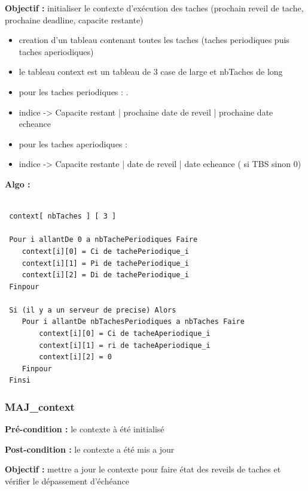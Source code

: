 				\textbf{Objectif : }initialiser le contexte d'exécution des taches (prochain reveil de tache, prochaine deadline, capacite restante)
				 \begin{itemize}
				 	\item creation d'un tableau contenant toutes les taches (taches periodiques puis taches aperiodiques)
 				 	\item le tableau context est un tableau de 3 case de large et nbTaches de long
 				 	\item pour les taches periodiques :
 		. 				\item[] indice -> Capacite restant | prochaine date de reveil | prochaine date echeance
 					\item pour les taches aperiodiques : 
 						\item[] indice -> Capacite restante | date de reveil | date echeance ( si TBS sinon 0)
				\end{itemize}
				\textbf{Algo :} 
					\begin{lstlisting}
 
 context[ nbTaches ] [ 3 ]
 
 Pour i allantDe 0 a nbTachePeriodiques Faire
 	context[i][0] = Ci de tachePeriodique_i
 	context[i][1] = Pi de tachePeriodique_i
 	context[i][2] = Di de tachePeriodique_i
 Finpour
 
 Si (il y a un serveur de precise) Alors
 	Pour i allantDe nbTachesPeriodiques a nbTaches Faire
 		context[i][0] = Ci de tacheAperiodique_i
 		context[i][1] = ri de tacheAperiodique_i
 		context[i][2] = 0 
 	Finpour
 Finsi
					\end{lstlisting}			
					
			\subsubsection{MAJ\_context}
				\textbf{Pré-condition : }le contexte à été initialisé
				
				\textbf{Post-condition : }le contexte a été mis a jour 
				
				\textbf{Objectif : }mettre a jour le contexte pour faire état des reveils de taches et vérifier le dépassement d'échéance 
				
